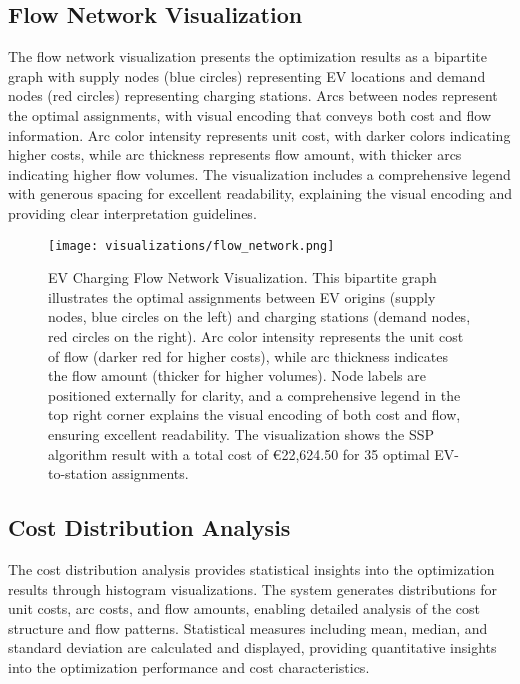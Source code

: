 \documentclass[12pt,a4paper]{article}
\begin{document}
\subsection{Flow Network Visualization}

The flow network visualization presents the optimization results as a bipartite graph with supply nodes (blue circles) representing EV locations and demand nodes (red circles) representing charging stations. Arcs between nodes represent the optimal assignments, with visual encoding that conveys both cost and flow information. Arc color intensity represents unit cost, with darker colors indicating higher costs, while arc thickness represents flow amount, with thicker arcs indicating higher flow volumes. The visualization includes a comprehensive legend with generous spacing for excellent readability, explaining the visual encoding and providing clear interpretation guidelines.

\begin{figure}[H]
    \centering
    \texttt{[image: visualizations/flow\_network.png]}
    \caption{EV Charging Flow Network Visualization. This bipartite graph illustrates the optimal assignments between EV origins (supply nodes, blue circles on the left) and charging stations (demand nodes, red circles on the right). Arc color intensity represents the unit cost of flow (darker red for higher costs), while arc thickness indicates the flow amount (thicker for higher volumes). Node labels are positioned externally for clarity, and a comprehensive legend in the top right corner explains the visual encoding of both cost and flow, ensuring excellent readability. The visualization shows the SSP algorithm result with a total cost of €22,624.50 for 35 optimal EV-to-station assignments.}
    \label{fig:flow_network_visualization}
\end{figure}

\subsection{Cost Distribution Analysis}

The cost distribution analysis provides statistical insights into the optimization results through histogram visualizations. The system generates distributions for unit costs, arc costs, and flow amounts, enabling detailed analysis of the cost structure and flow patterns. Statistical measures including mean, median, and standard deviation are calculated and displayed, providing quantitative insights into the optimization performance and cost characteristics.
\end{document}
